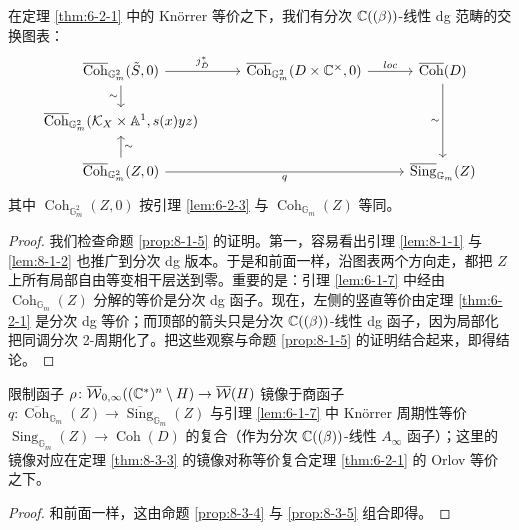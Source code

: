 \begin{proposition}\label{prop:8-3-5}
在定理 \ref{thm:6-2-1} 中的 Kn{\"o}rrer 等价之下，我们有分次 $\mathbb{C}((\beta))$-线性 dg 范畴的交换图表：
\[
\begin{tikzcd}[column sep=2.6em, row sep=1.6em]
\overline{\operatorname{Coh}}_{\mathbb G_m^2}(\tilde S,0) \arrow[r, "j_{\tilde D}^*"] \arrow[d, "{\sim}"'] & \overline{\operatorname{Coh}}_{\mathbb G_m^2}(D\times\C^\times,0) \arrow[r, "loc"] & \overline{\operatorname{Coh}}(D) \arrow[dd, "{\sim}"'] \\
\overline{\operatorname{Coh}}_{\mathbb G_m^2}(\cK_X\times\mathbb A^1,s(x)yz) & & \\
\overline{\operatorname{Coh}}_{\mathbb G_m^2}(Z,0) \arrow[u, "{\sim}"'] \arrow[rr, "q"'] & & \overline{\operatorname{Sing}}_{\mathbb G_m}(Z)
\end{tikzcd}
\]
其中 $\operatorname{Coh}_{\mathbb G_m^2}(Z,0)$ 按引理 \ref{lem:6-2-3} 与 $\operatorname{Coh}_{\mathbb G_m}(Z)$ 等同。
\end{proposition}

\begin{proof}
我们检查命题 \ref{prop:8-1-5} 的证明。第一，容易看出引理 \ref{lem:8-1-1} 与 \ref{lem:8-1-2} 也推广到分次 dg 版本。于是和前面一样，沿图表两个方向走，都把 $Z$ 上所有局部自由等变相干层送到零。重要的是：引理 \ref{lem:6-1-7} 中经由 $\operatorname{Coh}_{\mathbb G_m}(Z)$ 分解的等价是分次 dg 函子。现在，左侧的竖直等价由定理 \ref{thm:6-2-1} 是分次 dg 等价；而顶部的箭头只是分次 $\mathbb{C}((\beta))$-线性 dg 函子，因为局部化把同调分次 2-周期化了。把这些观察与命题 \ref{prop:8-1-5} 的证明结合起来，即得结论。
\end{proof}

\begin{theorem}\label{thm:8-3-6}
限制函子 $\rho\colon\overline{\mathcal{W}}_{0,\infty}((\mathbb{C}^*)^n\setminus H)\to\overline{\mathcal{W}}(H)$ 镜像于商函子 $q\colon\overline{\operatorname{Coh}}_{\mathbb G_m}(Z)\to\overline{\operatorname{Sing}}_{\mathbb G_m}(Z)$ 与引理 \ref{lem:6-1-7} 中 Kn{\"o}rrer 周期性等价 $\operatorname{Sing}_{\mathbb G_m}(Z)\to\operatorname{Coh}(D)$ 的复合（作为分次 $\mathbb{C}((\beta))$-线性 $A_\infty$ 函子）；这里的镜像对应在定理 \ref{thm:8-3-3} 的镜像对称等价复合定理 \ref{thm:6-2-1} 的 Orlov 等价之下。
\end{theorem}

\begin{proof}
和前面一样，这由命题 \ref{prop:8-3-4} 与 \ref{prop:8-3-5} 组合即得。
\end{proof}


